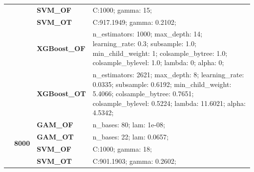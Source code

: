 \documentclass[runningheads]{llncs}
\begin{document}
\begin{table}
\begin{tabularx}{\textwidth}{>{\RaggedRight\arraybackslash}m{1.6cm}p{1.225cm}p{2.05cm}>{\RaggedRight\arraybackslash}X}
        \textbf{}                               & \textbf{}                         & \textbf{SVM\_OF}     & C:\@1000; gamma: 15;                                                                                                                                                                              \\
        \textbf{}                               & \textbf{}                         & \textbf{SVM\_OT}     & C:\@917.1949; gamma: 0.2102;                                                                                                                                                                      \\
        \textbf{}                               & \textbf{}                         & \textbf{XGBoost\_OF} & n\_estimators: 1000; max\_depth: 14; learning\_rate: 0.3; subsample: 1.0; min\_child\_weight: 1; colsample\_bytree: 1.0; colsample\_bylevel: 1.0; lambda: 0; alpha: 0;                            \\
        \textbf{}                               & \textbf{}                         & \textbf{XGBoost\_OT} & n\_estimators: 2621; max\_depth: 8; learning\_rate: 0.0335; subsample: 0.6192; min\_child\_weight: 5.4066; colsample\_bytree: 0.7651; colsample\_bylevel: 0.5224; lambda: 11.6021; alpha: 4.5342; \\
        \cline{2-4}
        \textbf{}                               & \multirow[t]{7}{*}{\textbf{8000}} & \textbf{GAM\_OF}     & n\_bases: 80; lam: 1e-08;                                                                                                                                                                         \\
        \textbf{}                               & \textbf{}                         & \textbf{GAM\_OT}     & n\_bases: 22; lam: 0.0657;                                                                                                                                                                        \\
        \textbf{}                               & \textbf{}                         & \textbf{SVM\_OF}     & C:\@1000; gamma: 18;                                                                                                                                                                              \\
        \textbf{}                               & \textbf{}                         & \textbf{SVM\_OT}     & C:\@901.1903; gamma: 0.2602;                                                                                                                                                                      \\

\end{tabularx}
\end{table}
\end{document}
